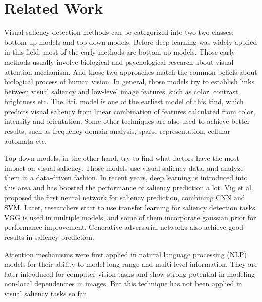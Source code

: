 \documentclass[12pt]{article}
\begin{document}
\section{Related Work}
Visual saliency detection methods can be categorized into two two classes: bottom-up models and top-down models\cite{congReviewVisualSaliency2019}.
Before deep learning was widely applied in this field, most of the early methods are bottom-up models.
Those early methods usually involve biological and psychological research about visual attention mechanism. And those two approaches match the common beliefs about biological process of human vision.
In general, those models try to establish links between visual saliency and low-level image features, such as color, contrast, brightness etc. The Itti. model\cite{ittiModelSaliencybasedVisual1998}
is one of the earliest model of this kind, which predicts visual saliency from linear combination of features calculated from color, intensity and orientation.
Some other techniques are also used to achieve better results, such as frequency domain analysis, sparse representation, cellular automata etc\cite{congReviewVisualSaliency2019}.

Top-down models, in the other hand, try to find what factors have the most impact on visual saliency. Those models use visual saliency data, and analyze them in a data-driven fashion.
In recent years, deep learning is introduced into this area and has boosted the performance of saliency prediction a lot.
Vig et al. \cite{vigLargeScaleOptimizationHierarchical2014} proposed the first neural network for saliency prediction, combining CNN and SVM. Later, researchers start to use transfer learning for saliency 
detection tasks. VGG is used in multiple models\cite{kruthiventiDeepFixFullyConvolutional2015, kummererDeepGazeIIReading2016, corniaPredictingHumanEye2018}, and some of them incorporate gaussian prior for performance improvement.
Generative adversarial networks also achieve good results in saliency prediction\cite{panSalGANVisualSaliency2018, cheHowGazeInfluenced2020}.

Attention mechanisms were first applied in natural language processing (NLP) models for their ability to model long range and multi-level information\cite{bahdanauNeuralMachineTranslation2016a, vaswaniAttentionAllYou2017a}.
They are later introduced for computer vision tasks and show strong potential in modeling non-local dependencies in images\cite{zhangSelfAttentionGenerativeAdversarial2019a}.
But this technique has not been applied in visual saliency tasks so far.
\end{document}
